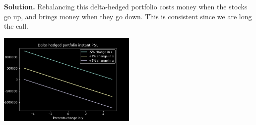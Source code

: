 \documentclass[12pt]{article}
\newenvironment{solution}{\vspace{0.2cm} \textbf{Solution.}}{}
\begin{document}
\begin{enumerate}[label=(\alph*)]
\begin{solution}
		Rebalancing this delta-hedged portfolio costs money when the stocks go up, and brings money when they go down. This is consistent since we are long the call.
		
		\begin{center}
			\includegraphics[width=0.5\textwidth]{instant_pnl}
		\end{center}
		
		\end{solution}
	
	\end{enumerate}
\end{document}
